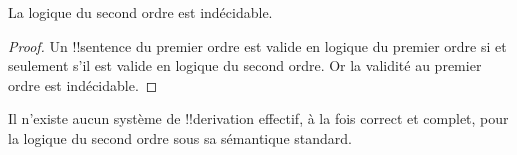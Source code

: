 \documentclass[../../../include/open-logic-section]{subfiles}
\begin{document}


\begin{thm}
La logique du second ordre est indécidable.
\end{thm}

\begin{proof}
Un !!{sentence} du premier ordre est valide en
logique du premier ordre si et seulement s'il
est valide en logique du second ordre. Or la
validité au premier ordre est indécidable.
\end{proof}

\begin{thm}
Il n'existe aucun système de !!{derivation}
effectif, à la fois correct et complet, pour
la logique du second ordre sous sa sémantique
standard.
\end{thm}
\end{document}

